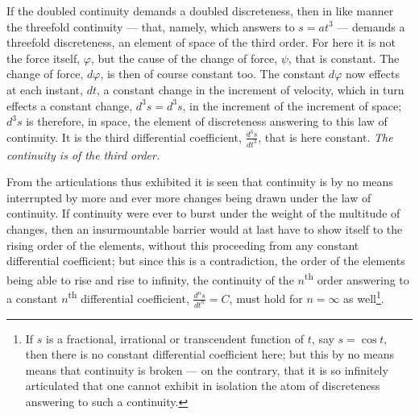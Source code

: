 \documentclass[12pt,a4paper]{book}
\begin{document}
If the doubled continuity demands a doubled discreteness, then in like manner
the threefold continuity --- that, namely, which answers to $s = at^3$ ---
demands a threefold discreteness, an element of space of the third order. For
here it is not the force itself, $\varphi$, but the cause of the change of
force, $\psi$, that is constant. The change of force, $d\varphi$, is then of
course constant too. The constant $d\varphi$ now effects at each instant,
$dt$, a constant change in the increment of velocity, which in turn effects a
constant change, $d^3s = d^3s$, in the increment of the increment of space;
$d^3s$ is therefore, in space, the element of discreteness answering to this
law of continuity. It is the third differential coefficient,
$\frac{d^3s}{dt^3}$, that is here constant. \emph{The continuity is of the
third order.}

From the articulations thus exhibited it is seen that continuity is by no means
interrupted by more and ever more changes being drawn under the law of
continuity. If continuity were ever to burst under the weight of the multitude
of changes, then an insurmountable barrier would at last have to show itself to
the rising order of the elements, without this proceeding from any constant
differential coefficient; but since this is a contradiction, the order of the
elements being able to rise and rise to infinity, the continuity of the
$n$\textsuperscript{th} order answering to a constant
$n$\textsuperscript{th} differential coefficient,
$\frac{d^ns}{dt^n} = C$, must hold for $n = \infty$ as well\footnote{If $s$ is
a fractional, irrational or transcendent function of $t$,
say $s = \cos t$, then there is no constant
differential coefficient here; but this by no means means that
continuity is broken --- on the contrary, that it is so infinitely
articulated that one cannot exhibit in isolation the atom of discreteness
answering to such a continuity.}.
\end{document}
